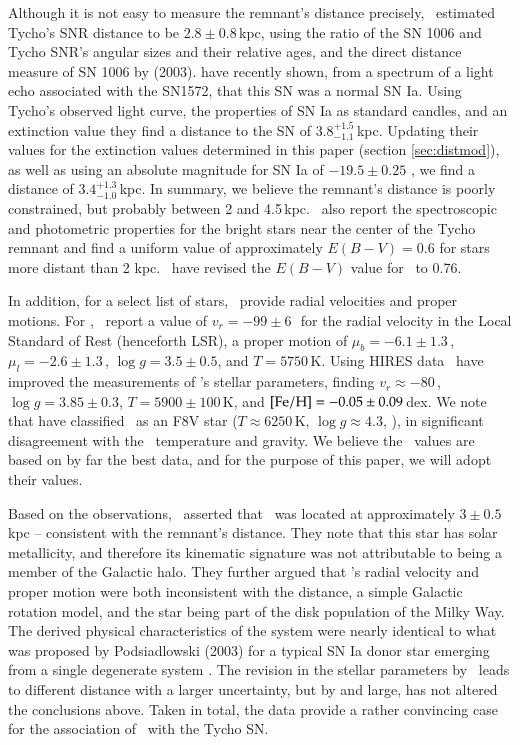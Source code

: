 Although it is not easy to measure the
remnant's distance precisely, \rl\ estimated Tycho's SNR distance to be $2.8 \pm 0.8$\,kpc, using the ratio of the SN 1006 and Tycho SNR's angular sizes and their relative ages, and the direct distance measure of SN 1006 by \citeauthor*{2003ApJ...585..324W} (2003).  \citet{2008Natur.456..617K} have recently shown, from a spectrum of a light echo associated with the SN1572, that this SN was a normal SN Ia. Using Tycho's observed light curve, the properties of SN Ia as standard candles, and an extinction value they find a distance to the SN of $3.8^{+1.5}_{-1.1}$\,kpc. Updating their values for the extinction values determined in this paper (section \ref{sec:distmod}), as well as using an absolute magnitude for SN Ia of $-19.5 \pm 0.25$ \citep{2004MNRAS.349.1344A}, we find a distance of $3.4^{+1.3}_{-1.0}$\,kpc. In summary, we believe the remnant's distance is poorly constrained, but probably between 2 and 4.5\,kpc.
\label{sec:obschar}
\rl\ also report the
spectroscopic and photometric properties for the bright stars near the
center of the Tycho remnant and find a uniform value of approximately
$E(B-V)=0.6$ for stars more distant than 2 kpc. \gh\ have revised the $E(B-V)$ value for \starg\ to 0.76.

In addition, for a select list of stars, \rl\ provide radial velocities and proper
motions. 
For \starg, \rl\ report a value of $v_r=-99\pm6$\,\kms\ for
the radial velocity in the Local Standard of Rest (henceforth LSR), a
proper motion of $\mu_b=-6.1 \pm 1.3$\,\masyr, $\mu_l=-2.6 \pm
1.3$\,\masyr, $\log{g} = 3.5 \pm 0.5$, and $T=5750$\,K.  Using HIRES data \gh\ have improved the measurements of \starg's stellar parameters, finding  $v_r \approx -80$\,\kms, $\log{g} = 3.85 \pm 0.3$, $T=5900 \pm 100$\,K, and $\rm{[Fe/H]}=-0.05 \pm 0.09$\,dex. We note that
\citet{2007PASJ...59..811I} have classified \starg\ as an F8V star ($T
\approx 6250 $\,K, $\log{g} \approx 4.3$,
\citealt{1982lbor.book.....A}), in significant disagreement with the
\rl\ temperature and gravity. We believe the \gh\  values are based on by far the best data, and for the purpose of this paper, we will adopt their values. 

Based on the observations, \rl\ asserted that \starg\ was located at
approximately $3\pm 0.5$\,kpc -- consistent with the remnant's
distance.  They note that this star has solar
metallicity, and therefore its kinematic signature was not
attributable to being a member of the Galactic halo. 
They further argued that \starg's radial velocity and proper
motion were both inconsistent with the distance, a simple Galactic
rotation model, and the star being part of the disk population of the Milky Way.
 The derived physical characteristics of the system were nearly identical to
what was proposed by Podsiadlowski (2003) for a typical SN Ia donor
star emerging from a single degenerate system \citep[e.g., U Sco; also see ][]{Hachisu:1996p758,Li:1997p437,Hachisu:1999p431,Han:2004p444,Han:2008p726}. The revision in the stellar parameters by
\gh\ leads to different distance with a larger uncertainty, but by and large, has not altered the conclusions above. Taken in total, the data provide a rather convincing case for the association of \starg\ with the Tycho SN.

